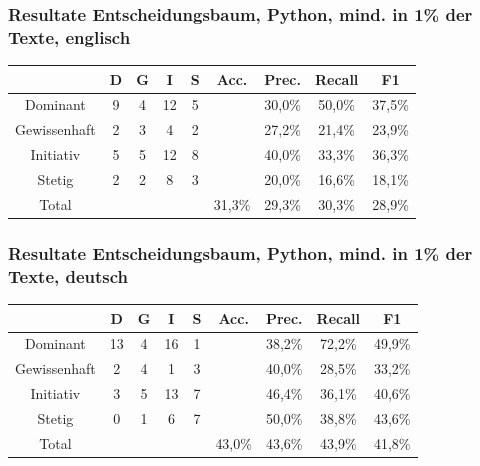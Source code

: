 \begin{frame}
\frametitle{Resultate Entscheidungsbaum, Python, mind. in 1\% der Texte, englisch}
\begin{center}
\begin{tabular}{|c|c|c|c|c|c|c|c|c|}
\hline
 &  D 	& G	& I & S	& Acc.	& Prec. & Recall	& F1\\
\hline
Dominant &     9 & 4 & 12 & 5& &30,0\% & 50,0\% & 37,5\% \\
Gewissenhaft & 2 & 3 & 4 & 2&& 27,2\% & 21,4\% & 23,9\% \\
Initiativ &    5 & 5 & 12 & 8&& 40,0\% & 33,3\% & 36,3\%\\
Stetig &       2 & 2 & 8 & 3&& 20,0\% & 16,6\% & 18,1\% \\
\hline
Total 	&		&		& &	& 31,3\%		& 29,3\% & 30,3\% & 28,9\% \\
\hline
\end{tabular}
\end{center}
\end{frame}
\begin{frame}
\frametitle{Resultate Entscheidungsbaum, Python, mind. in 1\% der Texte, deutsch}
\begin{center}
\begin{tabular}{|c|c|c|c|c|c|c|c|c|}
\hline
 &  D 	& G	& I & S	& Acc.	& Prec. & Recall	& F1\\
\hline
Dominant &     13 & 4 & 16 & 1&&  38,2\% & 72,2\% & 49,9\% \\
Gewissenhaft & 2 & 4 & 1 & 3 &&  40,0\% & 28,5\% & 33,2\%  \\
Initiativ &    3 & 5 & 13 & 7&& 46,4\% & 36,1\% & 40,6\%  \\
Stetig &       0 & 1 & 6 & 7 &&  50,0\% & 38,8\% & 43,6\% \\
\hline
Total 	&		&		& & 		&  43,0\%			&  43,6\% & 43,9\% & 41,8\% \\
\hline
\end{tabular}
\end{center}
\end{frame}
